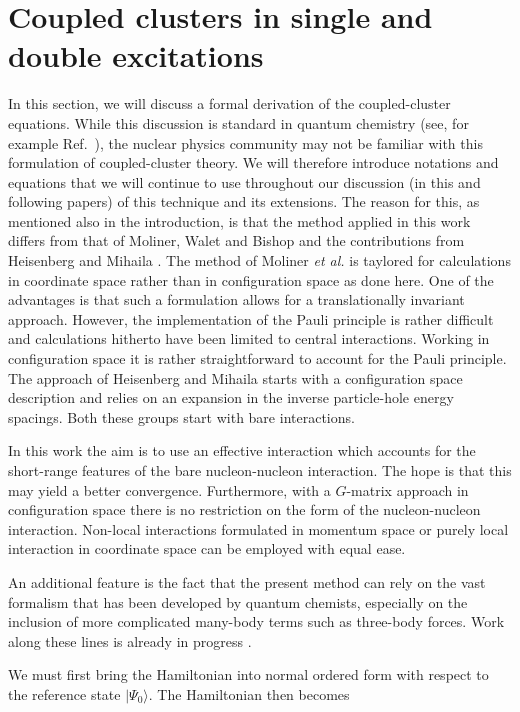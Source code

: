 \section{Coupled clusters in single and double excitations}
\label{sec:ccsd}


In this section, we will discuss a formal
derivation of the coupled-cluster equations.
While this discussion is
standard in quantum chemistry (see, for example Ref.~\cite{comp_chem_rev00}), 
the nuclear physics community may
not be familiar with this formulation of coupled-cluster theory. 
We will therefore introduce notations and equations that we 
will continue to use throughout our discussion (in this and 
following papers) of this technique and its extensions. 
The reason for this, 
as mentioned also in the introduction, is that the method applied in this
work differs from that
of Moliner, Walet and Bishop \cite{mwb02} and the contributions
from Heisenberg and Mihaila \cite{mh00a,mh00b,mh99,hm99}. 
The method of Moliner {\em et al.} \cite{mwb02} is taylored for 
calculations in coordinate space rather than in configuration space 
as done here. One of the advantages is that such a  formulation allows
for a translationally invariant approach. However, the implementation
of the Pauli principle is rather difficult and calculations hitherto
have been limited to central interactions. 
Working in configuration space it is rather straightforward to account for
the Pauli principle.
The approach of Heisenberg and Mihaila \cite{mh00a,mh00b,mh99,hm99} starts
with a configuration space description and relies on an expansion
in the inverse particle-hole energy spacings. 
Both these groups start with bare interactions. 

In this work the aim is to use an effective interaction which accounts 
for the short-range features of the bare nucleon-nucleon interaction.
The hope is that this may yield a better convergence. Furthermore, with a
$G$-matrix approach in configuration space there is no restriction
on the form of the nucleon-nucleon interaction. Non-local interactions
formulated in momentum space or purely local interaction in
coordinate space can be employed with equal ease.

An additional feature is the fact that the present method can rely on the
vast formalism that has been developed by quantum chemists, especially
on the inclusion of more complicated 
many-body terms such as three-body forces. Work along these lines is already in 
progress \cite{ccsdt03}.

We must first bring the Hamiltonian into normal ordered
form with respect to the reference state $\mid\Psi_0\rangle$. 
The Hamiltonian then becomes 

